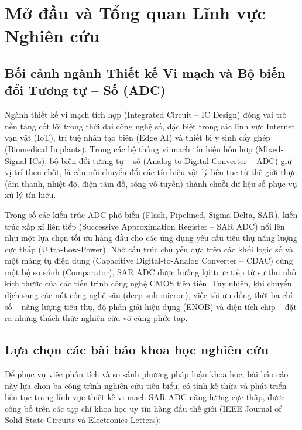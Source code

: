\documentclass[12pt,a4paper]{article}
\begin{document}
\newpage
{}
\tableofcontents
\newpage
{}

\section{Mở đầu và Tổng quan Lĩnh vực Nghiên cứu}

\subsection{Bối cảnh ngành Thiết kế Vi mạch và Bộ biến đổi Tương tự -- Số (ADC)}
Ngành thiết kế vi mạch tích hợp (Integrated Circuit -- IC Design) đóng vai trò nền tảng cốt lõi trong thời đại công nghệ số, đặc biệt trong các lĩnh vực Internet vạn vật (IoT), trí tuệ nhân tạo biên (Edge AI) và thiết bị y sinh cấy ghép (Biomedical Implants). Trong các hệ thống vi mạch tín hiệu hỗn hợp (Mixed-Signal ICs), bộ biến đổi tương tự -- số (Analog-to-Digital Converter -- ADC) giữ vị trí then chốt, là cầu nối chuyển đổi các tín hiệu vật lý liên tục từ thế giới thực (âm thanh, nhiệt độ, điện tâm đồ, sóng vô tuyến) thành chuỗi dữ liệu số phục vụ xử lý tín hiệu.

Trong số các kiến trúc ADC phổ biến (Flash, Pipelined, Sigma-Delta, SAR), kiến trúc xấp xỉ liên tiếp (Successive Approximation Register -- SAR ADC) nổi lên như một lựa chọn tối ưu hàng đầu cho các ứng dụng yêu cầu tiêu thụ năng lượng cực thấp (Ultra-Low-Power). Nhờ cấu trúc chủ yếu dựa trên các khối logic số và một mảng tụ điện dung (Capacitive Digital-to-Analog Converter -- CDAC) cùng một bộ so sánh (Comparator), SAR ADC được hưởng lợi trực tiếp từ sự thu nhỏ kích thước của các tiến trình công nghệ CMOS tiên tiến. Tuy nhiên, khi chuyển dịch sang các nút công nghệ sâu (deep sub-micron), việc tối ưu đồng thời ba chỉ số -- năng lượng tiêu thụ, độ phân giải hiệu dụng (ENOB) và diện tích chip -- đặt ra những thách thức nghiên cứu vô cùng phức tạp.

\subsection{Lựa chọn các bài báo khoa học nghiên cứu}
Để phục vụ việc phân tích và so sánh phương pháp luận khoa học, bài báo cáo này lựa chọn ba công trình nghiên cứu tiêu biểu, có tính kế thừa và phát triển liên tục trong lĩnh vực thiết kế vi mạch SAR ADC năng lượng cực thấp, được công bố trên các tạp chí khoa học uy tín hàng đầu thế giới (IEEE Journal of Solid-State Circuits và Electronics Letters):
\end{document}
